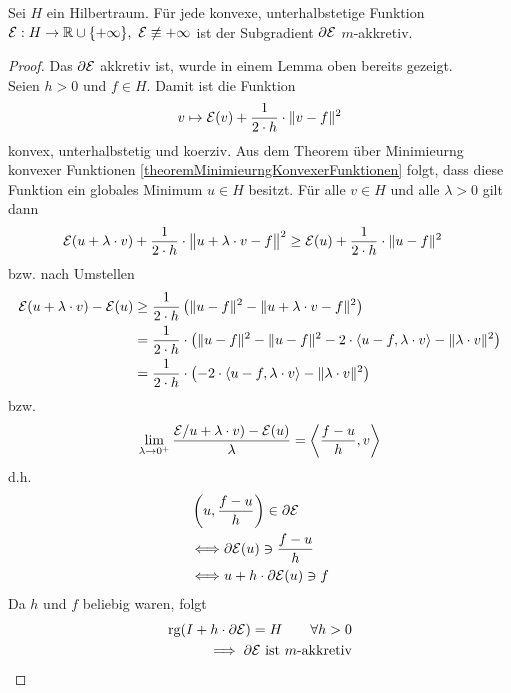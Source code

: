 \begin{theorem}
Sei $H$ ein Hilbertraum. Für jede konvexe, unterhalbstetige Funktion $\mathcal{E}:H\to\mathbb{R}\cup\lbrace+\infty\rbrace,~\mathcal{E}\not\equiv+\infty$ ist der Subgradient $\partial\mathcal{E}$ $m$-akkretiv.
\end{theorem}
\begin{proof}
Das $\partial\mathcal{E}$ akkretiv ist, wurde in einem Lemma oben bereits gezeigt.\\
Seien $h>0$ und $f\in H$. Damit ist die Funktion
\begin{align*}
v\mapsto \mathcal{E}(v)+\frac{1}{2\cdot h}\cdot\Vert v-f\Vert^2
\end{align*}
konvex, unterhalbstetig und koerziv. Aus dem Theorem über Minimieurng konvexer Funktionen \ref{theoremMinimieurngKonvexerFunktionen} folgt, dass diese Funktion ein globales Minimum $u\in H$ besitzt. Für alle $v\in H$ und alle $\lambda>0$ gilt dann
\begin{align*}
\mathcal{E}(u+\lambda\cdot v)+\frac{1}{2\cdot h}\cdot\big\Vert u+\lambda\cdot v-f\big\Vert^2
&\geq\mathcal{E}(u)+\frac{1}{2\cdot h}\cdot\Vert u-f\Vert^2
\end{align*}
bzw. nach Umstellen 
\begin{align*}
\mathcal{E}(u+\lambda\cdot v)-\mathcal{E}(u)
&\geq\frac{1}{2\cdot h}\left(\Vert u-f\Vert^2-\Vert u+\lambda\cdot v-f\Vert^2\right)\\
&=\frac{1}{2\cdot h}\cdot\left(\Vert u-f\Vert^2-\Vert u-f\Vert^2-2\cdot\langle u-f,\lambda\cdot v\rangle-\Vert \lambda\cdot v\Vert^2\right)\\
&=\frac{1}{2\cdot h}\cdot\left(-2\cdot\langle u-f,\lambda\cdot v\rangle-\Vert \lambda\cdot v\Vert^2\right)
\end{align*}
bzw.
\begin{align*}
\lim\limits_{\lambda\to 0^+}\frac{\mathcal{E}/u+\lambda\cdot v)-\mathcal{E}(u)}{\lambda}=\left\langle\frac{f-u}{h},v\right\rangle
\end{align*}
d.h. 
\begin{align*}
&\left( u,\frac{f-u}{h}\right)\in\partial\mathcal{E}\\
&\Longleftrightarrow\partial\mathcal{E}(u)\ni\frac{f-u}{h}\\
&\Longleftrightarrow u+h\cdot\partial\mathcal{E}(u)\ni f
\end{align*}
Da $h$ und $f$ beliebig waren, folgt
\begin{align*}
\text{rg}(I+h\cdot\partial\mathcal{E})=H\qquad\forall h>0\\
\implies\partial\mathcal{E}\text{ ist $m$-akkretiv}
\end{align*}
\end{proof}

